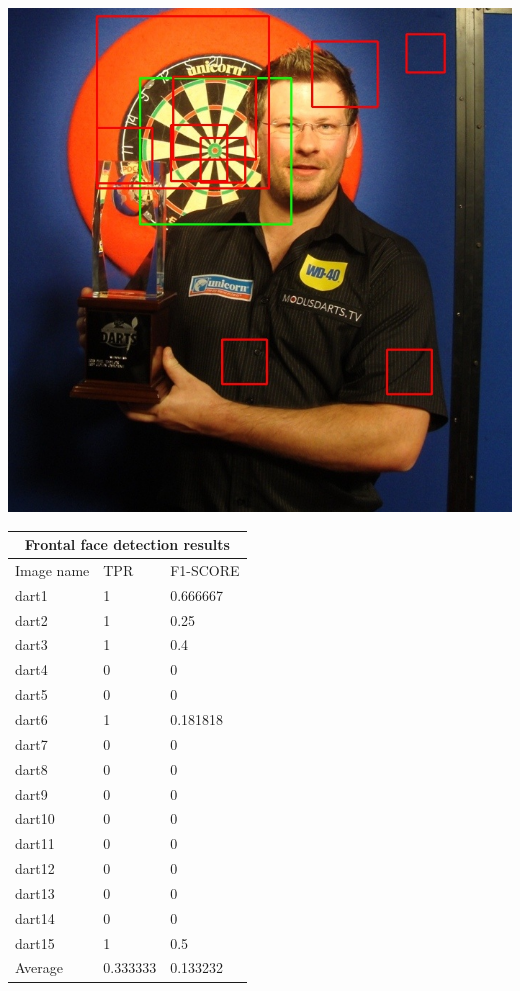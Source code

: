 \documentclass{article}
\begin{document}
\begin{multicols}{2}
\begin{multicols}{3}
    \includegraphics[width=\linewidth]{dart4-dart.jpg}\par
\end{multicols}


\begin{tabular}{ |p{2cm}||p{2cm}|p{2cm}| }
 \hline
 \multicolumn{3}{|c|}{Frontal face detection results} \\
 \hline
 Image name & TPR & F1-SCORE \\
 \hline
 dart1  & 1  & 0.666667   \\
 dart2  & 1  & 0.25       \\
 dart3  & 1  & 0.4        \\
 dart4  & 0  & 0          \\
 dart5  & 0  & 0          \\
 dart6  & 1  & 0.181818   \\
 dart7  & 0  & 0          \\
 dart8  & 0  & 0          \\
 dart9  & 0  & 0          \\
 dart10 & 0  & 0          \\
 dart11 & 0  & 0          \\
 dart12 & 0  & 0          \\
 dart13 & 0  & 0          \\
 dart14 & 0  & 0          \\
 dart15 & 1  & 0.5        \\
 \hline
 Average& 0.333333  & 0.133232    \\ 
 \hline
\end{tabular}
\label{table:vjdarts}



\end{multicols}
\end{document}
